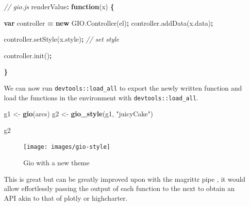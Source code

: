 \documentclass[10pt,]{krantz}
\makeatletter
\newenvironment{Shaded}{\begin{snugshade}}{\end{snugshade}}
\newcommand{\AttributeTok}[1]{\textcolor[rgb]{0.61,0.61,0.61}{#1}}
\newcommand{\CommentTok}[1]{\textcolor[rgb]{0.37,0.37,0.37}{\textit{#1}}}
\newcommand{\KeywordTok}[1]{\textcolor[rgb]{0.27,0.27,0.27}{\textbf{#1}}}
\newcommand{\NormalTok}[1]{#1}
\newcommand{\OperatorTok}[1]{\textcolor[rgb]{0.43,0.43,0.43}{\textbf{#1}}}
\newcommand{\StringTok}[1]{\textcolor[rgb]{0.5,0.5,0.5}{#1}}
\newcommand{\VariableTok}[1]{\textcolor[rgb]{0,0,0}{#1}}
\newenvironment{kframe}{%
\medskip{}
\setlength{\fboxsep}{.8em}
 \def\at@end@of@kframe{}%
 \ifinner\ifhmode%
  \def\at@end@of@kframe{\end{minipage}}%
  \begin{minipage}{\columnwidth}%
 \fi\fi%
 \def\FrameCommand##1{\hskip\@totalleftmargin \hskip-\fboxsep
 \colorbox{shadecolor}{##1}\hskip-\fboxsep
     \hskip-\linewidth \hskip-\@totalleftmargin \hskip\columnwidth}%
 \MakeFramed {\advance\hsize-\width
   \@totalleftmargin\z@ \linewidth\hsize
   \@setminipage}}%
 {\par\unskip\endMakeFramed%
 \at@end@of@kframe}
\renewenvironment{Shaded}{\begin{kframe}}{\end{kframe}}
\makeatother
\begin{document}
\begin{Shaded}
\begin{Highlighting}[]
\CommentTok{// gio.js}
\NormalTok{renderValue}\OperatorTok{:} \KeywordTok{function}\NormalTok{(x) }\OperatorTok{\{}

  \KeywordTok{var}\NormalTok{ controller }\OperatorTok{=} \KeywordTok{new} \VariableTok{GIO}\NormalTok{.}\AttributeTok{Controller}\NormalTok{(el)}\OperatorTok{;}
  \VariableTok{controller}\NormalTok{.}\AttributeTok{addData}\NormalTok{(}\VariableTok{x}\NormalTok{.}\AttributeTok{data}\NormalTok{)}\OperatorTok{;} 

  \VariableTok{controller}\NormalTok{.}\AttributeTok{setStyle}\NormalTok{(}\VariableTok{x}\NormalTok{.}\AttributeTok{style}\NormalTok{)}\OperatorTok{;} \CommentTok{// set style}

  \VariableTok{controller}\NormalTok{.}\AttributeTok{init}\NormalTok{()}\OperatorTok{;}

\OperatorTok{\}}
\end{Highlighting}
\end{Shaded}

We can now run \texttt{devtools::load\_all} to export the newly written function and load the functions in the environment with \texttt{devtools::load\_all}.

\begin{Shaded}
\begin{Highlighting}[]
\NormalTok{g1 <-}\StringTok{ }\KeywordTok{gio}\NormalTok{(arcs)}
\NormalTok{g2 <-}\StringTok{ }\KeywordTok{gio_style}\NormalTok{(g1, }\StringTok{"juicyCake"}\NormalTok{)}

\NormalTok{g2}
\end{Highlighting}
\end{Shaded}

\begin{figure}[H]

{\centering \texttt{[image: images/gio-style]} 

}

\caption{Gio with a new theme}\label{fig:gio-style}
\end{figure}

This is great but can be greatly improved upon with the magrittr pipe \citep{R-magrittr}, it would allow effortlessly passing the output of each function to the next to obtain an API akin to that of plotly or highcharter.

\begin{Shaded}
\end{Shaded}
\end{document}
